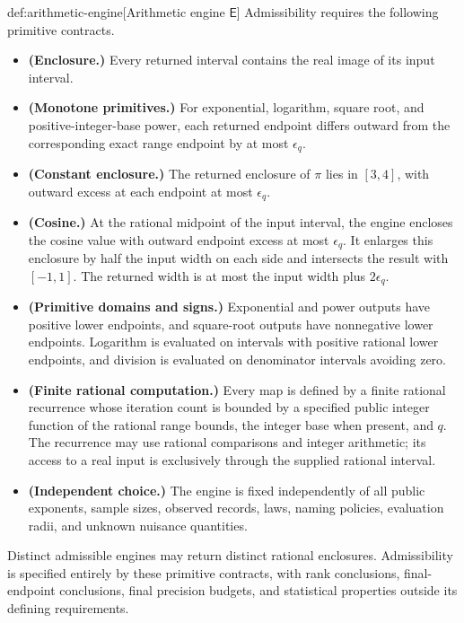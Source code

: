 \documentclass[11pt]{article}
\begin{document}
\begin{definitionv}{def:arithmetic-engine}[Arithmetic engine $\mathsf E$]
Admissibility requires the following primitive contracts.
\begin{itemize}
\item \textbf{(Enclosure.)} Every returned interval contains the real image of its input interval.
\item \textbf{(Monotone primitives.)} For exponential, logarithm, square root, and positive-integer-base power, each returned endpoint differs outward from the corresponding exact range endpoint by at most \(\epsilon_q\).
\item \textbf{(Constant enclosure.)} The returned enclosure of \(\pi\) lies in \([3,4]\), with outward excess at each endpoint at most \(\epsilon_q\).
\item \textbf{(Cosine.)} At the rational midpoint of the input interval, the engine encloses the cosine value with outward endpoint excess at most \(\epsilon_q\). It enlarges this enclosure by half the input width on each side and intersects the result with \([-1,1]\). The returned width is at most the input width plus \(2\epsilon_q\).
\item \textbf{(Primitive domains and signs.)} Exponential and power outputs have positive lower endpoints, and square-root outputs have nonnegative lower endpoints. Logarithm is evaluated on intervals with positive rational lower endpoints, and division is evaluated on denominator intervals avoiding zero.
\item \textbf{(Finite rational computation.)} Every map is defined by a finite rational recurrence whose iteration count is bounded by a specified public integer function of the rational range bounds, the integer base when present, and \(q\). The recurrence may use rational comparisons and integer arithmetic; its access to a real input is exclusively through the supplied rational interval.
\item \textbf{(Independent choice.)} The engine is fixed independently of all public exponents, sample sizes, observed records, laws, naming policies, evaluation radii, and unknown nuisance quantities.
\end{itemize}
Distinct admissible engines may return distinct rational enclosures. Admissibility is specified entirely by these primitive contracts, with rank conclusions, final-endpoint conclusions, final precision budgets, and statistical properties outside its defining requirements.
\end{definitionv}
\end{document}
